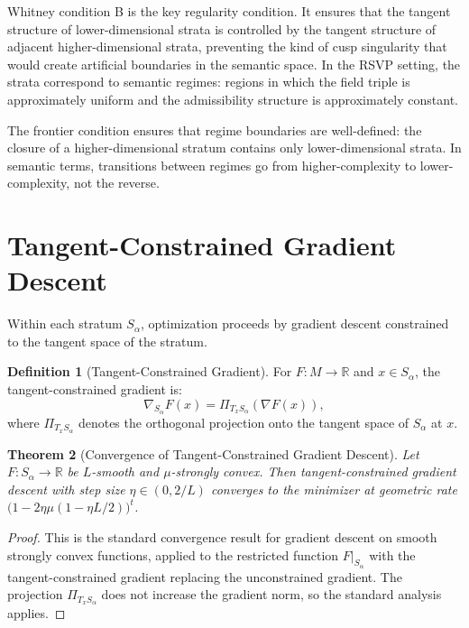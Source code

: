 \documentclass[12pt, oneside]{book}
\theoremstyle{flyxion}
\newtheorem{theorem}{Theorem}[chapter]
\theoremstyle{definition}
\newtheorem{definition}[theorem]{Definition}
\begin{document}
Whitney condition B is the key regularity condition. It
ensures that the tangent structure of lower-dimensional
strata is controlled by the tangent structure of
adjacent higher-dimensional strata, preventing the
kind of cusp singularity that would create artificial
boundaries in the semantic space. In the RSVP setting,
the strata correspond to semantic regimes: regions in
which the field triple is approximately uniform and
the admissibility structure is approximately constant.

The frontier condition ensures that regime boundaries
are well-defined: the closure of a higher-dimensional
stratum contains only lower-dimensional strata. In
semantic terms, transitions between regimes go from
higher-complexity to lower-complexity, not the reverse.

\section{Tangent-Constrained Gradient Descent}

Within each stratum $S_\alpha$, optimization proceeds
by gradient descent constrained to the tangent space of
the stratum.

\begin{definition}[Tangent-Constrained Gradient]
For $F : M \to \mathbb{R}$ and $x \in S_\alpha$, the
tangent-constrained gradient is:
\[
\nabla_{S_\alpha} F(x) = \Pi_{T_x S_\alpha}(\nabla F(x)),
\]
where $\Pi_{T_x S_\alpha}$ denotes the orthogonal
projection onto the tangent space of $S_\alpha$ at $x$.
\end{definition}

\begin{theorem}[Convergence of Tangent-Constrained Gradient
Descent]
\label{thm:tartan_convergence}
Let $F : S_\alpha \to \mathbb{R}$ be $L$-smooth and
$\mu$-strongly convex. Then tangent-constrained gradient
descent with step size $\eta \in (0, 2/L)$ converges to
the minimizer at geometric rate $\bigl(1 - 2\eta\mu(1 -
\eta L/2)\bigr)^t$.
\end{theorem}

\begin{proof}
This is the standard convergence result for gradient
descent on smooth strongly convex functions, applied
to the restricted function $F|_{S_\alpha}$ with the
tangent-constrained gradient replacing the unconstrained
gradient. The projection $\Pi_{T_x S_\alpha}$ does not
increase the gradient norm, so the standard analysis
applies.
\end{proof}
\end{document}

